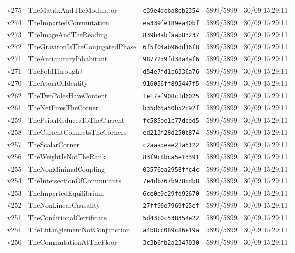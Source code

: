 \documentclass[11pt]{article}
\theoremstyle{definition}\newtheorem{deriv}{Derivação}
\begin{document}
{\begin{longtable}{@{}lllll@{}}
v275 & TheMatrixAndTheModulator & \texttt{c39e4dcba8eb2354} & 5899/5899 & 30/09 15:29:11 \\
v274 & TheImportedCommutation & \texttt{ea339fe189ea40bf} & 5899/5899 & 30/09 15:29:11 \\
v273 & TheImageAndTheReading & \texttt{839b4abfaab83237} & 5899/5899 & 30/09 15:29:11 \\
v272 & TheGravitonIsTheConjugatedPhase & \texttt{6f5f04ab96dd16f8} & 5899/5899 & 30/09 15:29:11 \\
v271 & TheAntiunitaryInhabitant & \texttt{98772d9fd38a4af6} & 5899/5899 & 30/09 15:29:11 \\
v271 & TheFoldThroughJ & \texttt{d54e7fd1c6336a76} & 5899/5899 & 30/09 15:29:11 \\
v270 & TheAtomOfIdentity & \texttt{916056ff895447f5} & 5899/5899 & 30/09 15:29:11 \\
v262 & TheTwoPolesHaveContent & \texttt{1e17af908c1d6025} & 5899/5899 & 30/09 15:29:11 \\
v261 & TheNetFiresTheCorner & \texttt{b35d65a50b52d92f} & 5899/5899 & 30/09 15:29:11 \\
v259 & ThePsionReducesToTheCurrent & \texttt{fc585ee1c77dded5} & 5899/5899 & 30/09 15:29:11 \\
v258 & TheCurrentConnectsTheCorners & \texttt{ed213f28d250b874} & 5899/5899 & 30/09 15:29:11 \\
v257 & TheScalarCorner & \texttt{c2aaadeae21a5122} & 5899/5899 & 30/09 15:29:11 \\
v256 & TheWeightIsNotTheRank & \texttt{83f9c8bca5e13391} & 5899/5899 & 30/09 15:29:11 \\
v255 & TheNonMinimalCoupling & \texttt{03576ea2958ffc4c} & 5899/5899 & 30/09 15:29:11 \\
v254 & TheIntersectionOfCommutants & \texttt{7e4db767b978ddb8} & 5899/5899 & 30/09 15:29:11 \\
v253 & TheImportedEquilibrium & \texttt{6ce0e9c29fd92670} & 5899/5899 & 30/09 15:29:11 \\
v252 & TheNonLinearCausality & \texttt{27ff96e7969f25ef} & 5899/5899 & 30/09 15:29:11 \\
v251 & TheConditionalCertificate & \texttt{5d43b0c538354e22} & 5899/5899 & 30/09 15:29:11 \\
v251 & TheEntanglementNotConjunction & \texttt{a4b8cc089c86e19a} & 5899/5899 & 30/09 15:29:11 \\
v250 & TheCommutationAtTheFloor & \texttt{3c3b6fb2a2347030} & 5899/5899 & 30/09 15:29:11 \\

\end{longtable}}
\end{document}
